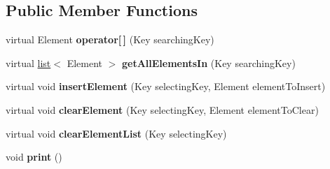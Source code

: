 \subsection*{Public Member Functions}
\begin{DoxyCompactItemize}
\item 
\hypertarget{class_monitored_extensible_map_a373519b4bdf48a5956e67e254a233f45}{
virtual Element {\bfseries operator\mbox{[}$\,$\mbox{]}} (Key searchingKey)}
\label{class_monitored_extensible_map_a373519b4bdf48a5956e67e254a233f45}

\item 
\hypertarget{class_monitored_extensible_map_ab8d93d985f1ba067229d09df671f9b44}{
virtual \hyperlink{classlist}{list}$<$ Element $>$ {\bfseries getAllElementsIn} (Key searchingKey)}
\label{class_monitored_extensible_map_ab8d93d985f1ba067229d09df671f9b44}

\item 
\hypertarget{class_monitored_extensible_map_a2bd30f0646f89ab8b34e604ebe1d61ed}{
virtual void {\bfseries insertElement} (Key selectingKey, Element elementToInsert)}
\label{class_monitored_extensible_map_a2bd30f0646f89ab8b34e604ebe1d61ed}

\item 
\hypertarget{class_monitored_extensible_map_a0d61d39b7a148d5dd3ff63542e8180f1}{
virtual void {\bfseries clearElement} (Key selectingKey, Element elementToClear)}
\label{class_monitored_extensible_map_a0d61d39b7a148d5dd3ff63542e8180f1}

\item 
\hypertarget{class_monitored_extensible_map_a12f0ef1695b7ded4e23fdcf4888a33f9}{
virtual void {\bfseries clearElementList} (Key selectingKey)}
\label{class_monitored_extensible_map_a12f0ef1695b7ded4e23fdcf4888a33f9}

\item 
\hypertarget{class_monitored_extensible_map_a3cdb615ce2e560ab5b0343dd1e72de73}{
void {\bfseries print} ()}
\label{class_monitored_extensible_map_a3cdb615ce2e560ab5b0343dd1e72de73}

\end{DoxyCompactItemize}
